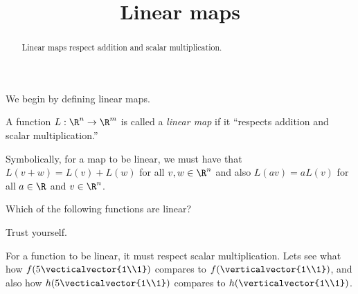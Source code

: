 \documentclass{ximera}
\title{Linear maps}
\begin{document}
\begin{abstract}
  Linear maps respect addition and scalar multiplication.
\end{abstract}

We begin by defining linear maps.

\begin{definition}
  A function $L: \R^n \to \R^m$ is called a \textit{linear map} if it
  ``respects addition and scalar multiplication.''

  Symbolically, for a map to be linear, we must have that $L(v+w) =
  L(v)+L(w)$ for all $v,w \in \R^n$ and also $L(av) = a L(v)$ for all
  $a \in \R$ and $v\in \R^n$.
\end{definition}

\begin{question}
  Which of the following functions are linear?
  \begin{solution}
    \begin{hint}
      Trust yourself.
    \end{hint}
    \begin{hint}
    	For a function to be linear, it must respect scalar multiplication.  Lets see what how $f(5 \vecticalvector{1\\1})$ compares to $f(\verticalvector{1\\1})$, and also how
	$h(5 \vecticalvector{1\\1})$ compares to $h(\verticalvector{1\\1})$.  
	

\end{hint}
\end{solution}
\end{question}
\end{document}
